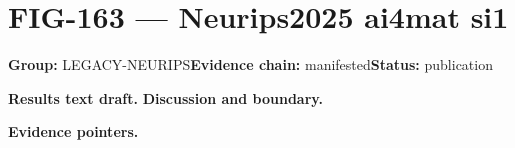 \clearpage
\section{FIG-163 --- Neurips2025 ai4mat si1}
\label{figpage:fig-163}
\textbf{Group:} LEGACY-NEURIPS\quad \textbf{Evidence chain:} manifested\quad \textbf{Status:} publication

\textbf{Results text draft.} 
\textbf{Discussion and boundary.} 


\textbf{Evidence pointers.}



\vfill
